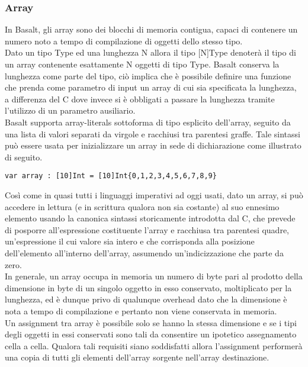 \subsubsection{Array}
In Basalt, gli array sono dei blocchi di memoria contigua, capaci di contenere un numero noto a tempo di compilazione di oggetti dello stesso tipo. \\

Dato un tipo Type ed una lunghezza N allora il tipo [N]Type denoterà il tipo di un array contenente esattamente  N oggetti di tipo Type. Basalt 
conserva la lunghezza come parte del tipo, ciò implica che è possibile definire una funzione che prenda come parametro di input un array di cui 
sia specificata la lunghezza, a differenza del C dove invece si è obbligati a passare la lunghezza tramite l’utilizzo di un parametro ausiliario.  \\

Basalt supporta array-literals sottoforma di tipo esplicito dell’array, seguito da una lista di valori separati 
da virgole e racchiusi tra parentesi graffe. Tale sintassi può essere usata per inizializzare un array in 
sede di dichiarazione come illustrato di seguito. \\

\vspace{0.5cm}
\begin{lstlisting}[frame=single]
var array : [10]Int = [10]Int{0,1,2,3,4,5,6,7,8,9}
\end{lstlisting}
\vspace{0.5cm}

Così come in quasi tutti i linguaggi imperativi ad oggi usati, dato un array, si può accedere in lettura (e in scrittura qualora non sia costante) 
al suo ennesimo elemento usando la canonica sintassi storicamente introdotta dal C, che prevede 
di posporre all’espressione costituente l’array e racchiusa tra parentesi quadre, un'espressione il cui valore sia intero e che 
corrisponda alla posizione dell’elemento all’interno dell’array, assumendo un’indicizzazione che parte da zero. \\

In generale, un array occupa in memoria un numero di byte pari al prodotto della dimensione 
in byte di un singolo oggetto in esso conservato, moltiplicato per la lunghezza, ed è dunque privo di qualunque overhead 
dato che la dimensione è nota a tempo di compilazione e pertanto non viene conservata in memoria. \\

Un assignment tra array è possibile solo se hanno la stessa dimensione e se i tipi 
degli oggetti in essi conservati sono tali da consentire un ipotetico assegnamento cella a cella. Qualora tali 
requisiti siano soddisfatti allora l’assignment performerà una copia di tutti gli elementi dell’array sorgente nell’array destinazione.